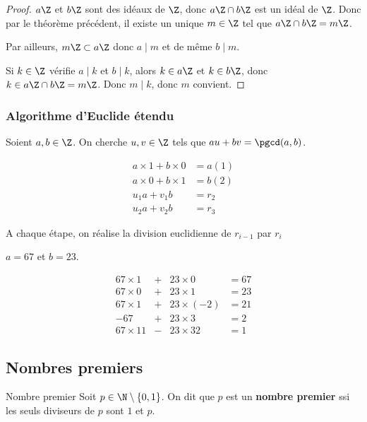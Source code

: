 \begin{proof}
    $a \Z$ et $b \Z$ sont des idéaux de $\Z$, donc $a \Z \cap b \Z$ est un idéal de $\Z$. 
    Donc par le théorème précédent, il existe un unique $m \in \Z$ tel que $a \Z \cap b \Z = m \Z$.

    Par ailleurs, $m \Z \subset a \Z$ donc $a \mid m$ et de même $b \mid m$.

    Si $k \in \Z$ vérifie $a \mid k$ et $b \mid k$, alors $k \in a \Z$ et $k \in b \Z$, donc
    $k \in a \Z \cap b \Z = m \Z$. Donc $m \mid k$, donc $m$ convient.
\end{proof}

\subsubsection{Algorithme d'Euclide étendu}

Soient $a, b \in \Z$. On cherche $u, v \in \Z$ tels que $au + bv = \pgcd(a, b)$.


\begin{align*}
    a \times 1 + b \times 0 & = a (1)\\
    a \times 0 + b \times 1 & = b (2)\\
    u_1 a + v_1 b & = r_2 \\
    u_2 a + v_2 b & = r_3 
\end{align*}

A chaque étape, on réalise la division euclidienne de $r_{i-1}$ par $r_i$

\begin{exemple}
    $a = 67$ et $b = 23$. 

    $$\begin{array}{rccl}
        67 \times 1 & + & 23 \times 0 & = 67 \\
        67 \times 0 & + & 23 \times 1 & = 23 \\
        67 \times 1 & + & 23 \times (-2) & = 21 \\
        -67 & + & 23 \times 3 & = 2 \\
        67 \times 11 & - & 23 \times 32 & = 1
    \end{array}$$
\end{exemple}

\subsection{Nombres premiers}

\begin{definition}{Nombre premier}{}
    Soit $p \in \N \setminus \{0, 1\}$. On dit que $p$ est un \textbf{nombre premier} ssi
    les seuls diviseurs de $p$ sont $1$ et $p$.
\end{definition}

